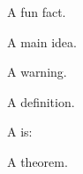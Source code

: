 \documentclass{dscslides}
\begin{document}
\begin{frame}
    \begin{funfact}
        A fun fact.
    \end{funfact}
\end{frame}

\begin{frame}
    \begin{mainidea}
        A main idea.
    \end{mainidea}
\end{frame}

\begin{frame}
    \begin{warning}
        A warning.
    \end{warning}
\end{frame}

\begin{frame}
    \begin{defn}
        A definition.
    \end{defn}
\end{frame}

\begin{frame}

    \begin{defn}
        A  is:

    \end{defn}

\end{frame}

\begin{frame}
    \begin{thm}
        A theorem.
    \end{thm}
\end{frame}
\end{document}
